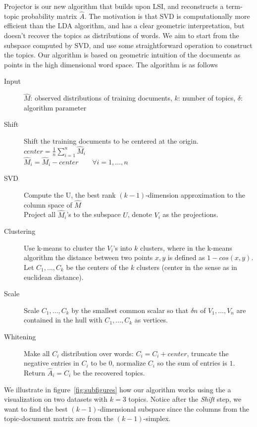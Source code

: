 Projector is our new algorithm that builds upon LSI, and reconstructs
a term-topic probability matrix $\hat{A}$. The motivation is that SVD
is computationally more efficient than the LDA algorithm, and has a
clear geometric interpretation, but doesn't recover the topics as
distributions of words. We aim to start from the subspace computed by
SVD, and use some straightforward operation to construct the
topics. Our algorithm is based on geometric intuition of the documents
as points in the high dimensional word space. The algorithm is as
follows
\begin{description}
	\item[Input] $\hat{M}$: observed distributions of training documents, $k$: number of topics, $\delta$: algorithm parameter
	\item[Shift] Shift the training documents to be centered at the origin.\\
			     $center=\frac{1}{n}\sum_{i=1}^n\hat{M}_i$\\
			     $\hat{M}_i=\hat{M}_i-center\qquad \forall i=1,\ldots,n$
	\item[SVD] Compute the U, the best rank $(k-1)$-dimension approximation to the column space of $\hat{M}$\\
                                 Project all $\hat{M}_i$'s to the subspace $U$, denote $V_i$ as the projections.
	\item[Clustering] Use k-means to cluster the $V_i$'s into $k$ clusters, where in the k-means algorithm the distance between two points $x,y$ is defined as $1-cos(x,y)$.\\
				      Let $C_1,\ldots,C_k$ be the centers of the $k$ clusters (center in the sense as in euclidean distance).
	\item[Scale] Scale $C_1,\ldots,C_k$ by the smallest common scalar so that $\delta n$ of $V_1,\ldots,V_n$ are contained in the hull with $C_1,\ldots,C_k$ as vertices. 
	\item[Whitening] Make all $C_i$ distribution over words: $C_i=C_i+center$, truncate the negative entries in $C_i$ to be $0$, normalize $C_i$ so the sum of entries is $1$.\\
                                            Return $\hat{A}_i=C_i$ be the recovered topics.
\end{description}
We illustrate in figure~\ref{fig:subfigures} how our algorithm works
using the a visualization on two datasets with $k=3$
topics. Notice after the {\em Shift} step, we want to find the best
$(k-1)$-dimensional subspace since the columns from the topic-document
matrix are from the $(k-1)$-simplex.

